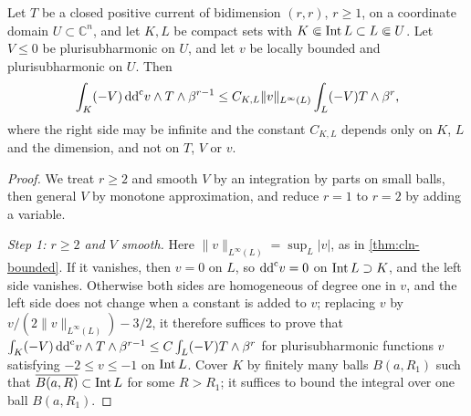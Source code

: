 \begin{lemma}\label{lem:relative-weighted-cln}
Let $T$ be a closed positive current of bidimension $(r,r)$, $r\geq1$, on a coordinate domain $U\subset\mathbb C^n$, and let $K,L$ be compact sets with $K\Subset\operatorname{Int} L\subset L\Subset U$. Let $V\leq0$ be plurisubharmonic on $U$, and let $v$ be locally bounded and plurisubharmonic on $U$. Then
\[
 \int_K(-V)\,\mathrm{dd}^{\mathrm{c}} v\wedge T\wedge\beta^{r-1}
       \leq C_{K,L}\|v\|_{L^\infty(L)}
                             \int_L(-V)T\wedge\beta^r,
\]
where the right side may be infinite and the constant $C_{K,L}$ depends only on $K$, $L$ and the dimension, and not on $T$, $V$ or $v$.
\end{lemma}
\begin{proof}
We treat $r\geq2$ and smooth $V$ by an integration by parts on small balls, then general $V$ by monotone approximation, and reduce $r=1$ to $r=2$ by adding a variable.

\emph{Step 1: $r\geq2$ and $V$ smooth.} Here $\|v\|_{L^\infty(L)}=\sup_L|v|$, as in \cref{thm:cln-bounded}. If it vanishes, then $v=0$ on $L$, so $\mathrm{dd}^{\mathrm{c}} v=0$ on $\operatorname{Int} L\supset K$, and the left side vanishes. Otherwise both sides are homogeneous of degree one in $v$, and the left side does not change when a constant is added to $v$; replacing $v$ by $v/(2\|v\|_{L^\infty(L)})-3/2$, it therefore suffices to prove that $\int_K(-V)\,\mathrm{dd}^{\mathrm{c}} v\wedge T\wedge\beta^{r-1}\leq C\int_L(-V)T\wedge\beta^r$ for plurisubharmonic functions $v$ satisfying $-2\leq v\leq-1$ on $\operatorname{Int} L$. Cover $K$ by finitely many balls $B(a,R_1)$ such that $\overline{B(a,R)}\subset\operatorname{Int} L$ for some $R>R_1$; it suffices to bound the integral over one ball $B(a,R_1)$.


\end{proof}

